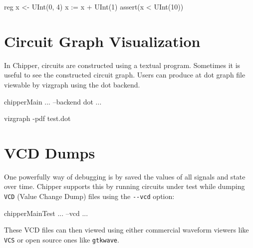 \begin{stanza}
reg x <- UInt(0, 4)
x := x + UInt(1)
assert(x < UInt(10))
\end{stanza}

\section{Circuit Graph Visualization}

In Chipper, circuits are constructed using a textual program.
Sometimes it is useful to see the constructed circuit graph.
Users can produce at dot graph file viewable by vizgraph using the dot backend.


\begin{stanza}
chipperMain ... --backend dot ...
\end{stanza}

\begin{bash}
vizgraph -pdf test.dot
\end{bash}

\section{VCD Dumps}

One powerfully way of debugging is by saved the values of all signals and state over time.
Chipper supports this by running circuits under test while 
dumping \verb+VCD+ (Value Change Dump) files using the \verb+--vcd+ option:

\begin{bash}
chipperMainTest ... --vcd ...
\end{bash}

These VCD files can then viewed using either commercial waveform viewers like \verb+VCS+ or open source ones like \verb+gtkwave+.


% 
